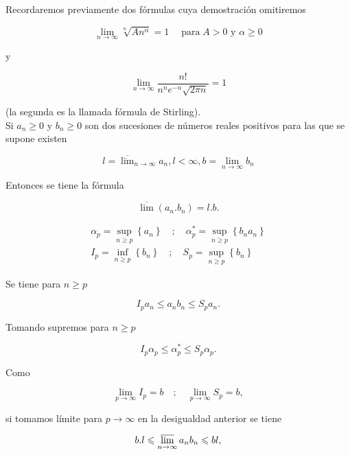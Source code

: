 \documentclass[10pt]{article}
\theoremstyle{plain}
\theoremstyle{definition}
\theoremstyle{remark}
\begin{document}
Recordaremos previamente dos fórmulas cuya demostración omitiremos


\begin{equation*}
\lim _{n \rightarrow \infty} \sqrt[n]{A n^{\alpha}}=1 \quad \operatorname{para} A>0 \text { y } \alpha \geqslant 0 \tag{9-2}
\end{equation*}


y


\begin{equation*}
\lim _{n \rightarrow \infty} \frac{n!}{n^{n} e^{-n} \sqrt{2 \pi n}}=1 \tag{9-3}
\end{equation*}


(la segunda es la llamada fórmula de Stirling).\\
Si $a_{n} \geqslant 0$ y $b_{n} \geqslant 0$ son dos sucesiones de números reales positivos para las que se supone existen

$$
l=\overline{\lim }_{n \rightarrow \infty} a_{n}, l<\infty, b=\lim _{n \rightarrow \infty} b_{n}
$$

Entonces se tiene la fórmula


\begin{equation*}
\overline{\lim }\left(a_{n} . b_{n}\right)=l . b . \tag{9-4}
\end{equation*}


$$
\begin{gathered}
\alpha_{p}=\sup _{n \geqslant p}\left\{a_{n}\right\} \quad ; \quad \alpha_{p}^{*}=\sup _{n \geqslant p}\left\{b_{n} a_{n}\right\} \\
I_{p}=\inf _{n \geqslant p}\left\{b_{n}\right\} \quad ; \quad S_{p}=\sup _{n \geqslant p}\left\{b_{n}\right\}
\end{gathered}
$$

Se tiene para $n \geqslant p$


$$
I_{p} a_{n} \leqslant a_{n} b_{n} \leqslant S_{p} a_{n} .
$$

Tomando supremos para $n \geqslant p$

$$
I_{p} \alpha_{p} \leqslant \alpha_{p}^{*} \leqslant S_{p} \alpha_{p} .
$$

Como

$$
\lim _{p \rightarrow \infty} I_{p}=b \quad ; \quad \lim _{p \rightarrow \infty} S_{p}=b,
$$

si tomamos límite para $p \rightarrow \infty$ en la desigualdad anterior se tiene

$$
b . l \leqslant \varlimsup_{n \rightarrow \infty} a_{n} b_{n} \leqslant b l,
$$
\end{document}
